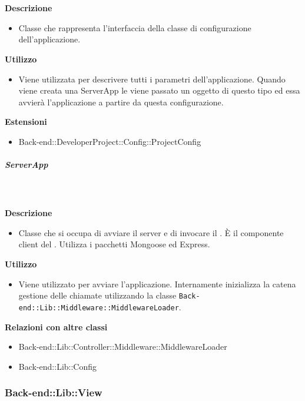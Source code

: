 				\textbf{\\ \\ Descrizione} 
					\begin{itemize}
						\item[] Classe che rappresenta l'interfaccia della classe di configurazione dell'applicazione.
					\end{itemize}      
				\textbf{Utilizzo}  
					\begin{itemize}
						\item[] Viene utilizzata per descrivere tutti i parametri dell'applicazione. Quando viene creata una ServerApp le viene passato un oggetto di questo tipo ed essa avvierà l'applicazione a partire da questa configurazione.
					\end{itemize}
					\textbf{Estensioni}
					\begin{itemize}
							\item{Back-end::DeveloperProject::Config::ProjectConfig}
					\end{itemize}
			\subparagraph{ServerApp}
				
				\textbf{\\ \\ Descrizione} 
					\begin{itemize}
						\item[] Classe che si occupa di avviare il server e di invocare il . È il componente client del  . Utilizza i pacchetti Mongoose ed Express.
					\end{itemize}      
				\textbf{Utilizzo}  
					\begin{itemize}
						\item[] Viene utilizzato per avviare l'applicazione. Internamente inizializza la catena gestione delle chiamate utilizzando la classe \texttt{Back-end::Lib::Middleware::MiddlewareLoader}.
					\end{itemize}
					\textbf{Relazioni con altre classi}
					\begin{itemize}
							\item{Back-end::Lib::Controller::Middleware::MiddlewareLoader}
							\item{Back-end::Lib::Config}
					\end{itemize}
	\subsubsection{Back-end::Lib::View}
